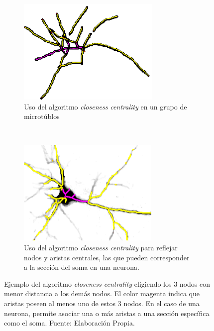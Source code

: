  \begin{figure}[h!]
    \centering
    \begin{subfigure}[t]{0.48\textwidth}
        \centering
        \includegraphics[height=2in]{imagenes/50-ROIs-Spinning-Marchantia-somaEdges.png}
        \caption{Uso del algoritmo {\it closeness centrality} en un grupo de microt\'ublos }
        \label{fig:SpinningCenterNodes}
    \end{subfigure}%
    ~ \hspace{0.5cm}
    \begin{subfigure}[t]{0.48\textwidth}
        \centering
        \includegraphics[height=2in]{imagenes/Porta18-3a1-somaEdges.png}
        \caption{Uso del algoritmo {\it closeness centrality} para reflejar nodos y aristas centrales, las que pueden corresponder a la secci\'on del soma en una neurona.}
        \label{fig:Porta18SomaNodes}
    \end{subfigure}

    \caption[Ejemplo del algoritmo {\it closeness centrality} eligiendo los 3 nodos con menor distancia a los dem\'as nodos.]{Ejemplo del algoritmo {\it closeness centrality} eligiendo los 3 nodos con menor distancia a los dem\'as nodos. El color magenta indica que aristas poseen al menos uno de estos 3 nodos. En el caso de una neurona, permite asociar una o m\'as aristas a una secci\'on espec\'ifica como el soma. Fuente: Elaboraci\'on Propia.}
    \label{fig:ExtraInfoCenterNodes}
\end{figure}

